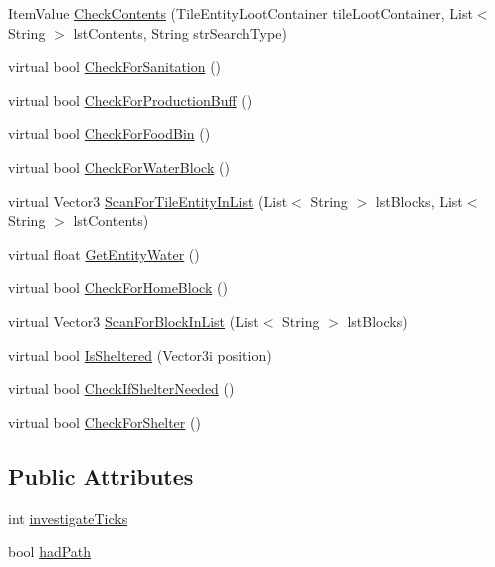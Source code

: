 \begin{DoxyCompactItemize}
\item 
Item\+Value \mbox{\hyperlink{class_e_a_i_maslow_level1_s_d_x_a5fb2f5ad8c518f78e0256c72eeaba1a5}{Check\+Contents}} (Tile\+Entity\+Loot\+Container tile\+Loot\+Container, List$<$ String $>$ lst\+Contents, String str\+Search\+Type)
\item 
virtual bool \mbox{\hyperlink{class_e_a_i_maslow_level1_s_d_x_ac6d6958eac70ef16cc2a4d7928fc785e}{Check\+For\+Sanitation}} ()
\item 
virtual bool \mbox{\hyperlink{class_e_a_i_maslow_level1_s_d_x_a17a03f22b02d59c303e12bd87cccb345}{Check\+For\+Production\+Buff}} ()
\item 
virtual bool \mbox{\hyperlink{class_e_a_i_maslow_level1_s_d_x_a03cc8884c63526dee61a79ca087ef8ff}{Check\+For\+Food\+Bin}} ()
\item 
virtual bool \mbox{\hyperlink{class_e_a_i_maslow_level1_s_d_x_a73ef3c59ba2a9c12f79ecbb96892d85d}{Check\+For\+Water\+Block}} ()
\item 
virtual Vector3 \mbox{\hyperlink{class_e_a_i_maslow_level1_s_d_x_a4da7fa23edca737091a05a5f9926bc9c}{Scan\+For\+Tile\+Entity\+In\+List}} (List$<$ String $>$ lst\+Blocks, List$<$ String $>$ lst\+Contents)
\item 
virtual float \mbox{\hyperlink{class_e_a_i_maslow_level1_s_d_x_af8a547ba8337d59ef8679bb62fbb8164}{Get\+Entity\+Water}} ()
\item 
virtual bool \mbox{\hyperlink{class_e_a_i_maslow_level1_s_d_x_ae71e14b4437a087ed4401c4d6a996997}{Check\+For\+Home\+Block}} ()
\item 
virtual Vector3 \mbox{\hyperlink{class_e_a_i_maslow_level1_s_d_x_a3a7a46cd66886329924c53823a9b55cc}{Scan\+For\+Block\+In\+List}} (List$<$ String $>$ lst\+Blocks)
\item 
virtual bool \mbox{\hyperlink{class_e_a_i_maslow_level1_s_d_x_a0a00bab216154da1cadba2fd1c20d708}{Is\+Sheltered}} (Vector3i position)
\item 
virtual bool \mbox{\hyperlink{class_e_a_i_maslow_level1_s_d_x_a8d47ef7842d1e77979df321a5ceab691}{Check\+If\+Shelter\+Needed}} ()
\item 
virtual bool \mbox{\hyperlink{class_e_a_i_maslow_level1_s_d_x_aae8929a489daf9e41a1841ba5e3beada}{Check\+For\+Shelter}} ()
\end{DoxyCompactItemize}
\subsection*{Public Attributes}
\begin{DoxyCompactItemize}
\item 
int \mbox{\hyperlink{class_e_a_i_maslow_level1_s_d_x_a1bc5caa9abb4e218b819188f2909e9c8}{investigate\+Ticks}}
\item 
bool \mbox{\hyperlink{class_e_a_i_maslow_level1_s_d_x_ad02259fefd140ce3cf568a0d72200da8}{had\+Path}}
\end{DoxyCompactItemize}


